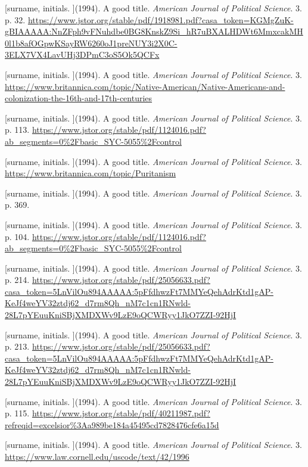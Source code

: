 \documentclass{article}
\begin{document}
\begin{thebibliography}{1}
\raggedright
{}
[surname, initials. ](1994). A good title. \emph{American Journal of Political Science}. 3. p. 32. \url{https://www.jstor.org/stable/pdf/1918981.pdf?casa_token=KGMgZuK-gBIAAAAA:NnZFph9vFNuhdbe0BG8KnskZ9Si_hR7uBXALHDWt6MmxcakMH0l1b8afOGpwKSayRW6260oJ1preNUY3i2X0C-3ELX7VX4LavUHj3DPmC3oS5Ok5QCFx}

[surname, initials. ](1994). A good title. \emph{American Journal of Political Science}. 3. \url{https://www.britannica.com/topic/Native-American/Native-Americans-and-colonization-the-16th-and-17th-centuries}

[surname, initials. ](1994). A good title. \emph{American Journal of Political Science}. 3. p. 113. \url{https://www.jstor.org/stable/pdf/1124016.pdf?ab_segments=0%2Fbasic_SYC-5055%2Fcontrol}

[surname, initials. ](1994). A good title. \emph{American Journal of Political Science}. 3. \url{https://www.britannica.com/topic/Puritanism}

[surname, initials. ](1994). A good title. \emph{American Journal of Political Science}. 3. p. 369. 

[surname, initials. ](1994). A good title. \emph{American Journal of Political Science}. 3. p. 104. \url{https://www.jstor.org/stable/pdf/1124016.pdf?ab_segments=0%2Fbasic_SYC-5055%2Fcontrol}

[surname, initials. ](1994). A good title. \emph{American Journal of Political Science}. 3. p. 214. \url{https://www.jstor.org/stable/pdf/25056633.pdf?casa_token=5LnVilOu894AAAAA:5pFfdhwzFt7MMYeQehAdrKtd1gAP-KeJf4weYV32ztdj62_d7rm8Qh_nM7c1cn1RNwld-28L7pYEuuKniSBjXMDXWv9LzE9oQCWRyy1JkO7ZZI-92HjI}

[surname, initials. ](1994). A good title. \emph{American Journal of Political Science}. 3. p. 213. \url{https://www.jstor.org/stable/pdf/25056633.pdf?casa_token=5LnVilOu894AAAAA:5pFfdhwzFt7MMYeQehAdrKtd1gAP-KeJf4weYV32ztdj62_d7rm8Qh_nM7c1cn1RNwld-28L7pYEuuKniSBjXMDXWv9LzE9oQCWRyy1JkO7ZZI-92HjI}

[surname, initials. ](1994). A good title. \emph{American Journal of Political Science}. 3. p. 115. \url{https://www.jstor.org/stable/pdf/40211987.pdf?refreqid=excelsior%3Aa989be184a45495cd7828476cfe6a15d}

[surname, initials. ](1994). A good title. \emph{American Journal of Political Science}. 3. \url{https://www.law.cornell.edu/uscode/text/42/1996}

\end{thebibliography}
\end{document}
